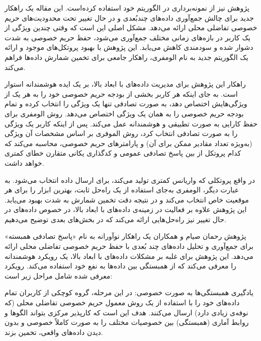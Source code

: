 
پژوهش  نیز از نمونه‌برداری در الگوریتم خود استفاده کرده‌است. این مقاله یک راهکار جدید برای چالش جمع‌آوری داده‌های چندبُعدی و در حال تغییر تحت محدودیت‌های حریم خصوصی تفاضلی محلی ارائه می‌دهد. مشکل اصلی این است که وقتی چندین ویژگی از یک کاربر در بازه‌های زمانی مختلف جمع‌آوری می‌شود، حفظ حریم خصوصی به شدت دشوار شده و  سودمندی کاهش می‌یابد. این پژوهش با بهبود پروتکل‌های موجود و ارائه یک الگوریتم جدید به نام الومفری، راهکار جامعی برای تخمین شمارش داده‌ها فراهم می‌کند.

راهکار این پژوهش برای مدیریت داده‌های با ابعاد بالا، بر یک ایده هوشمندانه استوار است. به جای اینکه هر کاربر بخشی از بودجه حریم خصوصی خود را به هر یک از ویژگی‌هایش اختصاص دهد، به صورت تصادفی تنها یک ویژگی را انتخاب کرده و تمام بودجه حریم خصوصی را به همان یک ویژگی اختصاص می‌دهد. روش الومفری برای حفظ کارایی به صورت تطبیقی و هوشمندانه عمل می‌کند. پس از اینکه کاربر یک ویژگی را به صورت تصادفی انتخاب کرد، روش الموفری بر اساس مشخصات آن ویژگی (به‌ویژه تعداد مقادیر ممکن برای آن) و پارامترهای حریم خصوصی، محاسبه می‌کند که کدام پروتکل از بین پاسخ تصادفی عمومی و کدگذاری یکانی متقارن خطای کمتری خواهد داشت.

در واقع پروتکلی که واریانس کمتری تولید می‌کند، برای ارسال داده انتخاب می‌شود. به عبارت دیگر، الومفری به‌جای استفاده از یک راه‌حل ثابت، بهترین ابزار را برای هر موقعیت خاص انتخاب می‌کند و در نتیجه دقت تخمین شمارش به شدت بهبود می‌یابد. این پژوهش علاوه بر فعالیت در زمینه‌ی داده‌های با ابعاد بالا، در خصوص داده‌های در حال تغییر نیز راه‌حل‌هایی ارائه می‌کند که در بخش‌های بعدی توضیح می‌دهیم.


پژوهش رحمان صیام و همکاران  یک راهکار نوآورانه به نام «پاسخ تصادفی همبسته» برای جمع‌آوری و تحلیل داده‌های چند بُعدی با حفظ حریم خصوصی تفاضلی محلی ارائه می‌دهد. این پژوهش برای غلبه بر مشکلات داده‌های با ابعاد بالا، یک رویکرد هوشمندانه را معرفی می‌کند که از همبستگی بین داده‌ها به نفع خود استفاده می‌کند. رویکرد معرفی شده شامل مراحل زیر است:


 یادگیری همبستگی‌ها به صورت خصوصی: در این مرحله، گروه کوچکی از کاربران تمام داده‌های خود را با استفاده از یک روش معمول حریم خصوصی تفاضلی محلی (که نوفه‌ی زیادی دارد) ارسال می‌کنند. هدف این است که کارپذیر مرکزی بتواند الگوها و روابط آماری (همبستگی) بین خصوصیات مختلف را به صورت کاملاً خصوصی و بدون دیدن داده‌های واقعی، تخمین بزند.

